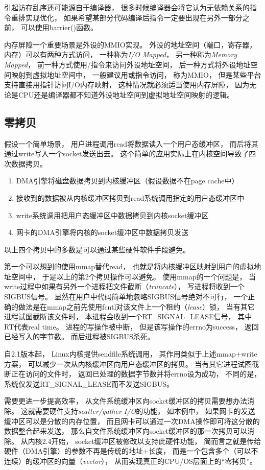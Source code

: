 引起访存乱序还可能源自于编译器，
很多时候编译器会将它认为无依赖关系的指令重排实现优化，
如果希望某部分代码编译后指令一定要出现在另外一部分之前，
可以使用barrier()函数。

内存屏障一个重要场景是外设的MMIO实现。
外设的地址空间（端口，寄存器，内存）可以有两种方式访问，
一种称为{\em I/O Mapped}，
另一种称为{\em Memory Mapped}，
前一种方式使用/指令来访问外设地址空间，
后一种方式将外设地址空间映射到虚拟地址空间中，
一般建议用或指令访问，
称为MMIO，
但是某些平台支持直接用指针访问I/O内存映射，
这种情况就必须适当使用内存屏障，
因为无论是CPU还是编译器都不知道外设地址空间到虚拟地址空间映射的逻辑。

\subsection{零拷贝}
假设一个简单场景，
用户进程调用read将数据读入一个用户态缓冲区，
而后将其通过write写入一个socket发送出去。
这个简单的应用实际上在内核空间导致了四次数据拷贝。
\begin{enumerate}
  \item DMA引擎将磁盘数据拷贝到内核缓冲区（假设数据不在page cache中）
  \item 接收到的数据被从内核缓冲区拷贝到read系统调用指定的用户态缓冲区中
  \item write系统调用把用户态缓冲区中数据拷贝到内核socket缓冲区
  \item 网卡的DMA引擎将内核的socket缓冲区中数据拷贝发送
\end{enumerate}
以上四个拷贝中的多数是可以通过某些硬件软件手段避免。

第一个可以想到的使用mmap替代read，
也就是将内核缓冲区映射到用户的虚拟地址空间中，
于是以上的第2个拷贝操作可以避免。
使用mmap的一个问题是，
当write过程中如果有另外一个进程把文件截断（{\em truncate}），
写进程将收到一个SIGBUS信号。
显然在用户中代码简单地忽略SIGBUS信号绝对不可行，
一个正确的做法是在mmap之前先使用fcntl对该文件上一个租约（{\em lease}）锁，
当有其它进程试图截断该文件时，
本进程会收到一个RT\_SIGNAL\_LEASE信号，
其中RT代表real time。
进程的写操作被中断，
但是该写操作的errno为success，
返回已经写入的字节数。
而后进程被SIGBUS杀死。

自2.1版本起，
Linux内核提供sendfile系统调用，
其作用类似于上述mmap+write方案，
可以减少一次从内核缓冲区向用户态缓冲区的拷贝。
当有其它进程试图截断正在访问的文件时，
返回已处理的数据字节数并将errno设为成功，
不同的是，
系统仅发送RT\_SIGNAL\_LEASE而不发送SIGBUS。

需要更进一步提高效率，
从文件系统缓冲区向socket缓冲区的拷贝需要想办法消除。
这就需要硬件支持\emph{scatter/gather I/O}的功能，
如本例中，
如果网卡的发送缓冲区可以是分散的内存位置，
而且网卡可以通过一次DMA操作即可将这分散的数据整合起来发送，
那么自文件系统缓冲区向socket缓冲区的那一次拷贝可以消除。
从内核2.4开始，
socket缓冲区被修改以支持此硬件功能，
简而言之就是传给硬件（DMA引擎）的参数不再是传统的地址+长度，
而是一个包含多个（可以不连续）的缓冲区的向量（{\em vector}），
从而实现真正的CPU/OS层面上的``零拷贝''。

